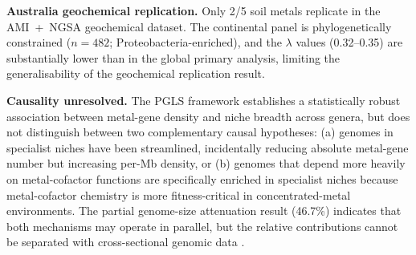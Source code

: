 \documentclass[times]{zHenriquesLab-StyleBioRxiv}
\begin{document}
\textbf{Australia geochemical replication.} Only 2/5 soil metals replicate in the
AMI~+~NGSA geochemical dataset. The continental panel is
phylogenetically constrained ($n = 482$; Proteobacteria-enriched), and the
$\lambda$ values (0.32--0.35) are substantially lower than in the global primary
analysis, limiting the generalisability of the geochemical replication result.

\textbf{Causality unresolved.} The PGLS framework establishes a statistically
robust association between metal-gene density and niche breadth across genera,
but does not distinguish between two complementary causal hypotheses: (a) genomes
in specialist niches have been streamlined, incidentally reducing absolute
metal-gene number but increasing per-Mb density, or (b) genomes that depend more
heavily on metal-cofactor functions are specifically enriched in specialist niches
because metal-cofactor chemistry is more fitness-critical in
concentrated-metal environments. The partial genome-size attenuation result
(46.7\%) indicates that both mechanisms may operate in parallel, but the relative
contributions cannot be separated with cross-sectional genomic data
.
\end{document}
